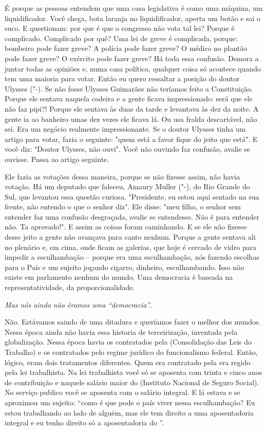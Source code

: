 É porque as pessoas entendem que uma casa legislativa
é como uma máquina, um liquidificador. Você chega, bota laranja no
liquidificador, aperta um botão e sai o suco. E questionam: por que é
que o congresso não vota tal lei? Porque é complicado. Complicado por
quê? Uma lei de greve é complicada, porque: bombeiro pode fazer greve? A
polícia pode fazer greve? O médico no plantão pode fazer greve? O
exército pode fazer greve? Há toda essa confusão. Demora a juntar todas
as opiniões e, numa casa política, qualquer coisa só acontece quando tem
uma maioria para votar. Então eu quero ressaltar a posição do doutor
Ulysses ("-). Se não fosse Ulysses Guimarães não teríamos feito a
Constituição. Porque ele sentava naquela cadeira e a gente ficava
impressionado: será que ele não faz pipi?! Porque ele sentava às duas da
tarde e levantava às dez da noite. A gente ia ao banheiro umas dez vezes
ele ficava lá. Ou usa fralda descartável, não sei. Era um negócio
realmente impressionante. Se o doutor Ulysses tinha um artigo para
votar, fazia o seguinte: "quem está a favor fique do jeito que está". E
você diz: "Doutor Ulysses, não ouvi". Você não ouvindo faz confusão,
avalie se ouvisse. Passa ao artigo seguinte.

Ele fazia as votações dessa maneira, porque se não fizesse assim, não
havia votação. Há um deputado que faleceu, Amaury Muller ("-), do
Rio Grande do Sul, que levantou essa questão curiosa. "Presidente, eu
estou aqui sentado na sua frente, não entendo o que o senhor diz". Ele
disse: "meu filho, o senhor sem entender faz uma confusão desgraçada,
avalie se entendesse. Não é para entender não. Ta aprovado!". E assim as
coisas foram caminhando. E se ele não fizesse desse jeito a gente não
avançava para canto nenhum. Porque a gente sentava ali no plenário e, em
cima, onde ficam as galerias, que hoje é cercado de vidro para impedir a
esculhambação -- porque era uma esculhambação, nós fazendo escolhas para
o País e um sujeito jogando cigarro, dinheiro, esculhambando. Isso não
existe em parlamento nenhum do mundo. Uma democracia é baseada na
representatividade, da proporcionalidade.

\medskip

\emph{Mas nós ainda não éramos uma ``democracia''}.

Não. Estávamos saindo de uma ditadura e queríamos
fazer o melhor dos mundos. Nessa época ainda não havia essa historia de
terceirização, inventada pela globalização. Nessa época havia os
contratados pela  (Consolidação das Leis do Trabalho) e os
contratados pelo regime jurídico do funcionalismo federal. Então,
lógico, eram dois tratamentos diferentes. Quem era contratado pela 
era regido pela lei trabalhista. Na lei trabalhista você só se aposenta
com trinta e cinco anos de contribuição e naquele salário maior do 
(Instituto Nacional de Seguro Social). No serviço publico você se
aposenta com o salário integral. E lá estava e se aproximou um sujeito:
``como é que pode o país viver nessa esculhambação? Eu estou trabalhando
ao lado de alguém, mas ele tem direito a uma aposentadoria integral e eu
tenho direito só a aposentadoria do ''.

